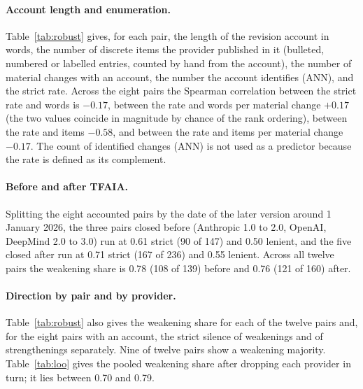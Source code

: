\documentclass{article}
\begin{document}
\paragraph{Account length and enumeration.} Table~\ref{tab:robust} gives, for each pair, the length of the revision account in words, the number of discrete items the provider published in it (bulleted, numbered or labelled entries, counted by hand from the account), the number of material changes with an account, the number the account identifies (ANN), and the strict rate. Across the eight pairs the Spearman correlation between the strict rate and words is $-0.17$, between the rate and words per material change $+0.17$ (the two values coincide in magnitude by chance of the rank ordering), between the rate and items $-0.58$, and between the rate and items per material change $-0.17$. The count of identified changes (ANN) is not used as a predictor because the rate is defined as its complement.
\paragraph{Before and after TFAIA.} Splitting the eight accounted pairs by the date of the later version around 1 January 2026, the three pairs closed before (Anthropic 1.0 to 2.0, OpenAI, DeepMind 2.0 to 3.0) run at 0.61 strict (90 of 147) and 0.50 lenient, and the five closed after run at 0.71 strict (167 of 236) and 0.55 lenient. Across all twelve pairs the weakening share is 0.78 (108 of 139) before and 0.76 (121 of 160) after.
\paragraph{Direction by pair and by provider.} Table~\ref{tab:robust} also gives the weakening share for each of the twelve pairs and, for the eight pairs with an account, the strict silence of weakenings and of strengthenings separately. Nine of twelve pairs show a weakening majority. Table~\ref{tab:loo} gives the pooled weakening share after dropping each provider in turn; it lies between 0.70 and 0.79.
\begin{table}[tbp]\centering\scriptsize
\caption{Per-pair robustness quantities. Words and Items describe the revision account; Mat.\ (acct) and ANN count material changes on pairs with an account and those the account identifies; Traced counts material changes excluding additions, over which Weak.\ share is computed; the last column gives strict silence among weakenings and among strengthenings, with counts.}
\label{tab:robust}
\resizebox{\linewidth}{!}{}
\end{table}
\begin{table}[tbp]\centering\small
\caption{Leave-one-provider-out weakening share among traced material changes.}
\label{tab:loo}

\end{table}
\end{document}
